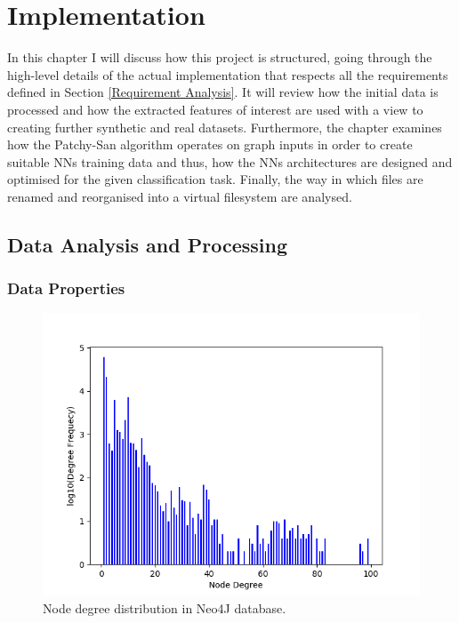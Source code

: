 

\chapter{Implementation}

In this chapter I will discuss how this project is structured, going through the high-level details of the actual implementation that respects all the requirements defined in Section \ref{Requirement Analysis}. It will review how the initial data is processed and how the extracted features of interest are used with a view to creating further synthetic and real datasets. Furthermore, the chapter examines how the Patchy-San algorithm operates on graph inputs in order to create suitable NNs training data and thus, how the NNs architectures are designed and optimised for the given classification task. Finally, the way in which files are renamed and reorganised into a virtual filesystem are analysed. \\


\section{Data Analysis and Processing}

\subsection{Data Properties}

\begin{figure}[H]
  \centering
  \centerline{\includegraphics[scale = 0.86]{Images/nodedegdist.png}}
  \caption{Node degree distribution in Neo4J database.}
  \label{nodedegdist}
\end{figure}

